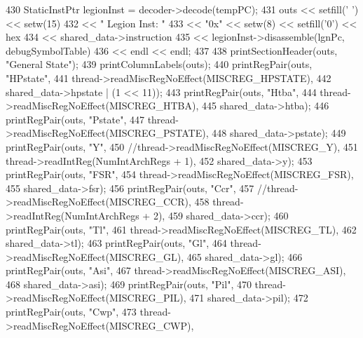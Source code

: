 \begin{DoxyCode}
{{{{{430                     StaticInstPtr legionInst = decoder->decode(tempPC);
431                     outs << setfill(' ') << setw(15)
432                          << " Legion Inst: "
433                          << "0x" << setw(8) << setfill('0') << hex
434                          << shared_data->instruction
435                          << legionInst->disassemble(lgnPc, debugSymbolTable)
436                          << endl << endl;
437 
438                     printSectionHeader(outs, "General State");
439                     printColumnLabels(outs);
440                     printRegPair(outs, "HPstate",
441                             thread->readMiscRegNoEffect(MISCREG_HPSTATE),
442                             shared_data->hpstate | (1 << 11));
443                     printRegPair(outs, "Htba",
444                             thread->readMiscRegNoEffect(MISCREG_HTBA),
445                             shared_data->htba);
446                     printRegPair(outs, "Pstate",
447                             thread->readMiscRegNoEffect(MISCREG_PSTATE),
448                             shared_data->pstate);
449                     printRegPair(outs, "Y",
450                             //thread->readMiscRegNoEffect(MISCREG_Y),
451                             thread->readIntReg(NumIntArchRegs + 1),
452                             shared_data->y);
453                     printRegPair(outs, "FSR",
454                             thread->readMiscRegNoEffect(MISCREG_FSR),
455                             shared_data->fsr);
456                     printRegPair(outs, "Ccr",
457                             //thread->readMiscRegNoEffect(MISCREG_CCR),
458                             thread->readIntReg(NumIntArchRegs + 2),
459                             shared_data->ccr);
460                     printRegPair(outs, "Tl",
461                             thread->readMiscRegNoEffect(MISCREG_TL),
462                             shared_data->tl);
463                     printRegPair(outs, "Gl",
464                             thread->readMiscRegNoEffect(MISCREG_GL),
465                             shared_data->gl);
466                     printRegPair(outs, "Asi",
467                             thread->readMiscRegNoEffect(MISCREG_ASI),
468                             shared_data->asi);
469                     printRegPair(outs, "Pil",
470                             thread->readMiscRegNoEffect(MISCREG_PIL),
471                             shared_data->pil);
472                     printRegPair(outs, "Cwp",
473                             thread->readMiscRegNoEffect(MISCREG_CWP),
}}}}}
\end{DoxyCode}
